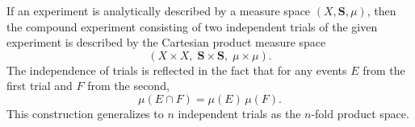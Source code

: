 If an experiment is analytically described by a measure space $(X, \mathbf{S}, \mu)$, then the compound experiment consisting of two independent trials of the given experiment is described by the Cartesian product measure space
$$(X \times X, \; \mathbf{S} \times \mathbf{S}, \; \mu \times \mu).$$
The independence of trials is reflected in the fact that for any events $E$ from the first trial and $F$ from the second,
$$\mu(E \cap F) = \mu(E) \, \mu(F).$$
This construction generalizes to $n$ independent trials as the $n$-fold product space.
